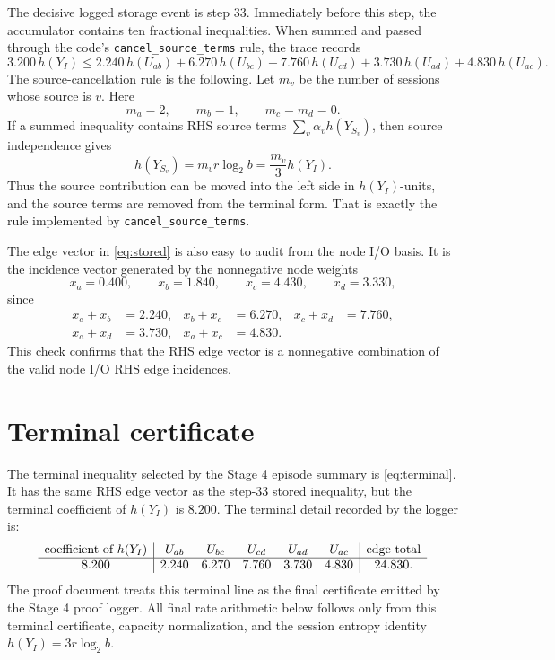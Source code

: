\documentclass[11pt]{article}
\newcommand{\YI}{Y_I}
\newcommand{\YS}[1]{Y_{S_{#1}}}
\newcommand{\U}[2]{U_{#1#2}}
\begin{document}
The decisive logged storage event is step 33.  Immediately before this step,
the accumulator contains ten fractional inequalities.  When summed and passed
through the code's \texttt{cancel\_source\_terms} rule, the trace records
\begin{equation}
\label{eq:stored}
3.200\,h(\YI)
\leq
2.240\,h(\U{a}{b})
+6.270\,h(\U{b}{c})
+7.760\,h(\U{c}{d})
+3.730\,h(\U{a}{d})
+4.830\,h(\U{a}{c}).
\end{equation}
The source-cancellation rule is the following.  Let \(m_v\) be the number of
sessions whose source is \(v\).  Here
\[
m_a=2,\qquad m_b=1,\qquad m_c=m_d=0.
\]
If a summed inequality contains RHS source terms
\(\sum_v \alpha_v h(\YS{v})\), then source independence gives
\[
h(\YS{v})=m_v r\log_2 b
=\frac{m_v}{3}h(\YI).
\]
Thus the source contribution can be moved into the left side in
\(h(\YI)\)-units, and the source terms are removed from the terminal form.
That is exactly the rule implemented by \texttt{cancel\_source\_terms}.

The edge vector in \eqref{eq:stored} is also easy to audit from the node I/O
basis.  It is the incidence vector generated by the nonnegative node weights
\[
x_a=0.400,\qquad x_b=1.840,\qquad x_c=4.430,\qquad x_d=3.330,
\]
since
\begin{align*}
x_a+x_b&=2.240,&
x_b+x_c&=6.270,&
x_c+x_d&=7.760,\\
x_a+x_d&=3.730,&
x_a+x_c&=4.830.
\end{align*}
This check confirms that the RHS edge vector is a nonnegative combination of
the valid node I/O RHS edge incidences.

\section{Terminal certificate}

The terminal inequality selected by the Stage 4 episode summary is
\eqref{eq:terminal}.  It has the same RHS edge vector as the step-33 stored
inequality, but the terminal coefficient of \(h(\YI)\) is \(8.200\).  The
terminal detail recorded by the logger is:
\[
\begin{array}{c|ccccc|c}
\hbox{coefficient of }h(\YI)
& \U{a}{b} & \U{b}{c} & \U{c}{d} & \U{a}{d} & \U{a}{c}
& \hbox{edge total}\\
\hline
8.200 & 2.240 & 6.270 & 7.760 & 3.730 & 4.830 & 24.830.
\end{array}
\]
The proof document treats this terminal line as the final certificate emitted
by the Stage 4 proof logger.  All final rate arithmetic below follows only
from this terminal certificate, capacity normalization, and the session entropy
identity \(h(\YI)=3r\log_2 b\).
\end{document}
